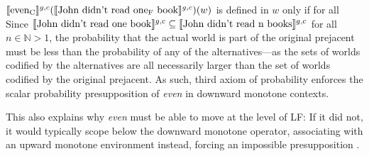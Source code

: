 \ex
$\intension[g,c]{even\textsubscript{C}}(\intension[g,c]{John didn't read one\textsubscript{F} book})(w)$ is defined in $w$ only if for all\linebreak{}
\xe
Since $\intension[g,c]{John didn't read one book}\subseteq\intension[g,c]{John didn't read n books}$ for all $n\in\mathbb{N}>1$, the probability that the actual world is part of the original prejacent must be less than the probability of any of the alternatives---as the sets of worlds codified by the alternatives are all necessarily larger than the set of worlds codified by the original prejacent. As such,  third axiom of probability enforces the scalar probability presupposition of \textit{even} in downward monotone contexts.

This also explains why \textit{even} must be able to move at the level of LF: If it did not, it would typically scope below the downward monotone operator, associating with an upward monotone environment instead, forcing an impossible presupposition \parencite[see, amongst others,][]{Karttunen1979,Lee1994,Crnic2011}.


